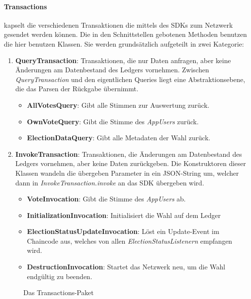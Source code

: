 \documentclass[parskip=full]{scrartcl}
\newcommand{\textitx}[1]{\mbox{\textit{#1}}}
\newcommand{\fakeparagraph}[1]{\textbf{#1}}
\begin{document}
	\paragraph{Transactions} kapselt die verschiedenen Transaktionen die mittels des SDKs zum Netzwerk gesendet werden können. Die in den Schnittstellen gebotenen Methoden benutzen die hier benutzen Klassen. Sie werden grundsätzlich aufgeteilt in zwei Kategorie:
	\begin{enumerate}
			\item\fakeparagraph{QueryTransaction}: Transaktionen, die nur Daten anfragen, aber keine Änderungen am Datenbestand des Ledgers vornehmen. Zwischen \textitx{QueryTransaction} und den eigentlichen Queries liegt eine Abstraktionsebene, die das Parsen der Rückgabe übernimmt.
			\begin{itemize}
				\item \fakeparagraph{AllVotesQuery}: Gibt alle Stimmen zur Auswertung zurück.
				\item \fakeparagraph{OwnVoteQuery}: Gibt die Stimme des \textitx{AppUsers} zurück.
				\item \fakeparagraph{ElectionDataQuery}: Gibt alle Metadaten der Wahl zurück.
			\end{itemize}
			\item \fakeparagraph{InvokeTransaction}: Transaktionen, die Änderungen am Datenbestand des Ledgers vornehmen, aber keine Daten zurückgeben. Die Konstruktoren dieser Klassen wandeln die übergeben Parameter in ein JSON-String um, welcher dann in \textitx{InvokeTransaction.invoke} an das SDK übergeben wird.
			\begin{itemize}
				\item \fakeparagraph{VoteInvocation}: Gibt die Stimme des \textitx{AppUsers} ab.
				\item \fakeparagraph{InitializationInvocation}: Initialisiert die Wahl auf dem Ledger
				\item \fakeparagraph{ElectionStatusUpdateInvocation}: Löst ein Update-Event im Chaincode aus, welches von allen \textitx{ElectionStatusListenern} empfangen wird.
				\item \fakeparagraph{DestructionInvocation}: Startet das Netzwerk neu, um die Wahl endgültig zu beenden.
			\end{itemize}
	\end{enumerate}
	\newpage
	\begin{figure}
		\centering
		\hspace{-100pt}
		\centerline{}
		\caption{Das Transactions-Paket}
		\label{fig:sdk_transaction}
	\end{figure}
	\thispagestyle{empty}
\end{document}
